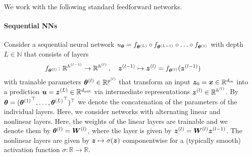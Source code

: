 We work with the following standard feedforward networks.

\paragraph{Sequential NNs} Consider a sequential neural network $%
u_{\vtheta} = f_{\vtheta^{(L)}} \circ f_{\vtheta^{(L-1)}} \circ \ldots \circ f_{\vtheta^{(1)}}
$ with depth $L\in\mathbb N$ that consists of layers %
\begin{align}
  \begin{split}
    f%
    _{\vtheta^{(l)}}\colon \sR^{h^{(l-1)}}
    &\to
      \sR^{h^{(l)}}\,,
    \quad \vz^{(l-1)}
    \mapsto
      \vz^{(l)} = f%
      _{\vtheta^{(l)}}(\vz^{(l-1)})
  \end{split}
\end{align}
with trainable parameters $\vtheta^{(l)} \in \sR^{p^{(l)}}%
$ that transform an input ${\bm{z}}_0={\bm{x}} \in \mathbb R^{d_{\operatorname{in}}}$ into a prediction ${\bm{u}} = {\bm{z}}^{(L)}\in {\mathbb{R}}^{d_{\operatorname{out}}}$ via intermediate representations $\vz^{(l)} \in \sR^{h^{(l)}}%
$.
By ${\bm{\theta}} = ({{\bm{\theta}}^{(1)}}^{\top}, \dots, {{\bm{\theta}}^{(L)}}^{\top})^{\top}$ we denote the concatenation of the parameters of the individual layers.
Here, we consider networks with alternating  linear and nonlinear layers.
Here, the weights of the linear layers are trainable and we denote them by ${\bm{\theta}}^{(l)} = {\bm{W}}^{(l)}$, where the layer is given by ${\bm{z}}^{(l)} = {\bm{W}}^{(l)} {\bm{z}}^{(l-1)}$.
The nonlinear layers are given by ${\bm{z}}\mapsto \sigma({\bm{z}})$ componentwise for a (typically smooth) activation function $\sigma\colon\mathbb R\to\mathbb R$.


